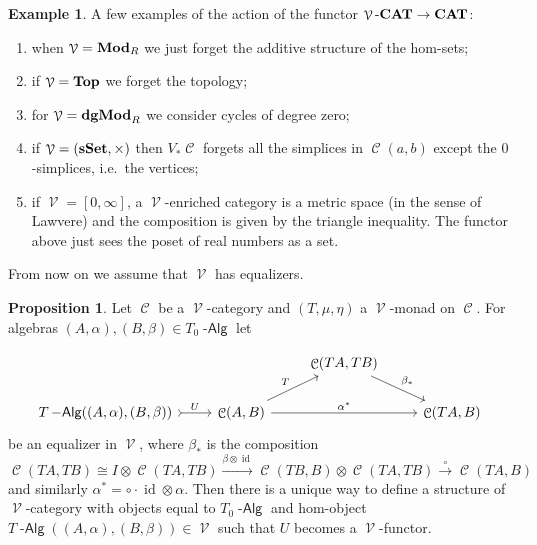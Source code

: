 \documentclass[a4paper,11pt,oneside,openany]{scrbook}
\newcommand{\catname}[1]{{\normalfont\textbf{#1}}}
\DeclareMathOperator{\Alg}{-\mathsf{Alg}}
\newcommand{\Top}{\catname{Top}}
\newcommand{\Mod}{\catname{Mod}}
\newcommand{\dgMod}{\catname{dgMod}}
\newcommand{\sSet}{\catname{sSet}}
\newcommand{\CAT}{\catname{CAT}}
\DeclareMathOperator{\V}{\mathcal{V}}
\DeclareMathOperator{\C}{\mathcal{C}}
\DeclareMathOperator{\id}{id}
\theoremstyle{definition}
\theoremstyle{definition}
\newtheorem{prop}[thm]{Proposition}
\newtheorem{exmp}[thm]{Example}
\begin{document}
\begin{exmp}
A few examples of the action of the functor $\V\mbox{-}\CAT\to\CAT$:
\begin{enumerate}
    \item when $\V=\Mod_R$ we just forget the additive structure of the hom-sets;
    \item if $\V=\Top$ we forget the topology;
    \item for $\V=\dgMod_R$ we consider cycles of degree zero;
    \item if $\V=(\sSet,\times)$ then $V_*\C$ forgets all the simplices in $\C(a,b)$ except the $0$-simplices, i.e.\ the vertices;
    \item if $\V=[0,\infty]$, a $\V$-enriched category is a metric space (in the sense of Lawvere) and the composition is given by the triangle inequality. The functor above just sees the poset of real numbers as a set.
\end{enumerate}
\end{exmp}
From now on we assume that $\V$ has equalizers.
\begin{prop}
Let $\C$ be a $\V$-category and $(T,\mu,\eta)$ a $\V$-monad on $\C$. For algebras $(A,\alpha), (B,\beta)\in T_0\Alg$ let 
\end{prop}
\[
\begin{tikzcd}
&& \C(TA,TB) \arrow[rd, "\beta_*"] &  \\
T\Alg((A,\alpha),(B,\beta)) \arrow[r, tail, "U"] & \C(A,B) \arrow[rr, "\alpha^*"] \arrow[ru, "T"] &             & \C(TA,B)
\end{tikzcd}
\]
be an equalizer in $\V$, where $\beta_*$ is the composition
$$\C(TA,TB)\cong I\otimes\C(TA,TB)\xrightarrow{\beta\otimes\id}\C(TB,B)\otimes\C(TA,TB)\xrightarrow{\circ}\C(TA,B)$$
and similarly $\alpha^*=\circ \cdot \id\otimes\alpha$. Then there is a unique way to define a structure of $\V$-category with objects equal to $T_0\Alg$ and hom-object $T\Alg((A,\alpha),(B,\beta))\in\V$ such that $U$ becomes a $\V$-functor.
\end{document}

